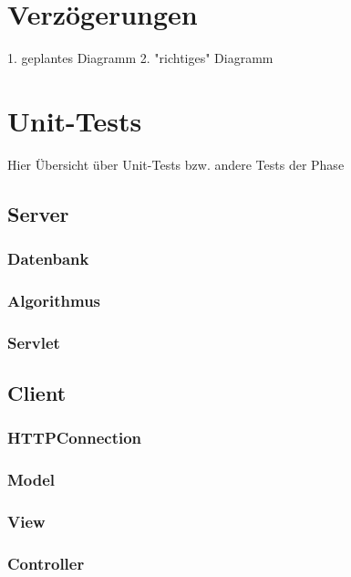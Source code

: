 \documentclass{scrartcl}
\begin{document}
	
	\newpage
	\section{Verzögerungen}
	1. geplantes Diagramm
	2. "richtiges" Diagramm
	
	\newpage
	\section{Unit-Tests}
	Hier Übersicht über Unit-Tests bzw. andere Tests der Phase
	\subsection{Server}
	\subsubsection{Datenbank}
	\subsubsection{Algorithmus}
	\subsubsection{Servlet}
	
	\subsection{Client}
	\subsubsection{HTTPConnection}
	\subsubsection{Model}
	\subsubsection{View}
	\subsubsection{Controller}
\end{document}
